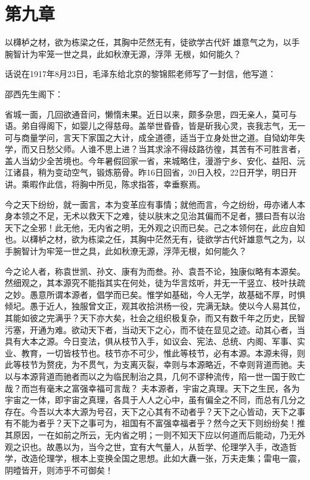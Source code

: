 \documentclass[../../dazhuan.tex]{subfiles}
\begin{document}
\chapter*{第九章}
\begin{pref}
	以欂栌之材，欲为栋梁之任，其胸中茫然无有，徒欲学古代奸	
雄意气之为，以手腕智计为牢笼一世之具，此如秋潦无源，浮萍
无根，如何能久？
\end{pref}

话说在1917年8月23日，毛泽东给北京的黎锦熙老师写了一封信，他写道：
\begin{xquote}
\noindent 邵西先生阁下： 

省城一面，几回欲通音问，懒惰未果。近日以来，颇多杂思，四无亲人，莫可与语。弟自得阁下，如婴儿之得慈母。盖举世昏昏，皆是斫我心灵，丧我志气，无一可与商量学问，言天下家国之大计，成全道德，适当于立身处世之道。自恸幼年失学，而又日愁父师。人谁不思上进？当其求涂不得歧路彷徨，其苦有不可胜言者，盖人当幼少全苦境也。今年暑假回家一省，来城略住，漫游宁乡、安化、益阳、沅江诸县，稍为变动空气，锻炼筋骨。昨16日回省，20日入校，22日开学，明日开讲。乘暇作此信，将胸中所见，陈求指答，幸垂察焉。 

今之天下纷纷，就一面言，本为变革应有事情；就他而言，今之纷纷，毋亦诸人本身本领之不足，无术以救天下之难，徒以肤末之见治其偏而不足者，猥曰吾有以治天下之全邪！此无他，无内省之明，无外观之识而已矣。己之本领何在，此应自知也。以欂栌之材，欲为栋梁之任，其胸中茫然无有，徒欲学古代奸雄意气之为，以手腕智计为牢笼一世之具，此如秋潦无源，浮萍无根，如何能久？ 

今之论人者，称袁世凯、孙文、康有为而叁。孙、袁吾不论，独康似略有本源矣。然细观之，其本源究不能指其实在何处，徒为华言炫听，并无一干竖立、枝叶扶疏之妙。愚意所谓本源者，倡学而已矣。惟学如基础，今人无学，故基础不厚，时惧倾圮。愚于近人，独服曾文正，观其收拾洪杨一役，完满无缺。使以今人易其位，其能如彼之完满乎？天下亦大矣，社会之组织极复杂，而又有数千年之历史，民智污塞，开通为难。欲动天下者，当动天下之心，而不徒在显见之迹。动其心者，当具有大本之源。今日变法，俱从枝节入手，如议会、宪法、总统、内阁、军事、实业、教育，一切皆枝节也。枝节亦不可少，惟此等枝节，必有本源。本源未得，则此等枝节为赘疣，为不贯气，为支离灭裂，幸则与本源略近，不幸则背道而驰。夫以与本源背道而驰者而以之为临民制治之具，几何不谬种流传，陷一世一国于败亡哉？而岂有毫末之富强幸福可言哉？ 夫本源者，宇宙之真理。天下之生民，各为宇宙之一体，即宇宙之真理，各具于人人之心中，虽有偏全之不同，而总有几分之存在。今吾以大本大源为号召，天下之心其有不动者乎？天下之心皆动，天下之事有不能为者乎？天下之事可为，祖国有不富强幸福者乎？然今之天下则纷纷矣！推其原因，一在如前之所云，无内省之明；一则不知天下应以何道而后能动，乃无外观之识也。故愚以为，当今之世，宜有大气量人，从哲学、伦理学入手，改造哲学，改造伦理学，根本上变换全国之思想。此如大纛一张，万夫走集；雷电一震，阴曀皆开，则沛乎不可御矣！


\end{xquote}
\end{document}
